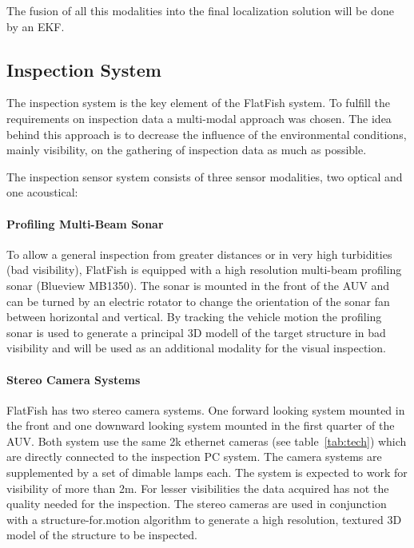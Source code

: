 \documentclass[conference]{IEEEtran}
\begin{document}
The fusion of all this modalities into the final localization solution will be done by an EKF.

\subsection{Inspection System}
\label{sec:insp}

The inspection system is the key element of the FlatFish system. To fulfill the requirements 
on inspection data a multi-modal approach was chosen. The idea behind this approach is 
to decrease the influence of the environmental conditions, mainly visibility, on the gathering 
of inspection data as much as possible.

The inspection sensor system consists of three sensor modalities, two optical and one 
acoustical:
\paragraph*{\textbf{Profiling Multi-Beam Sonar}} To allow a general inspection from greater 
distances or in very high turbidities (bad visibility), FlatFish is equipped with a high resolution 
multi-beam profiling sonar (Blueview MB1350). The sonar is mounted in the front of the AUV 
and can be turned by an electric rotator to change the orientation of the sonar fan between 
horizontal and vertical. By tracking the vehicle motion the profiling sonar is used to generate 
a principal 3D modell of the target structure in bad visibility and will be used as an 
additional modality for the visual inspection.

\paragraph*{\textbf{Stereo Camera Systems}} FlatFish has two stereo camera systems. 
One forward looking system mounted in the front and one downward looking system 
mounted in the first quarter of the AUV. Both system use the same 2k ethernet cameras 
(see table~\ref{tab:tech}) which are directly connected to the inspection PC system. The 
camera systems are supplemented by a set of dimable lamps each. The system is expected 
to work for visibility of more than 2m. For lesser visibilities the data acquired has not the 
quality needed for the inspection. The stereo cameras are used in conjunction with a 
structure-for.motion algorithm to generate a high resolution, textured 3D model of the 
structure to be inspected.
\end{document}

